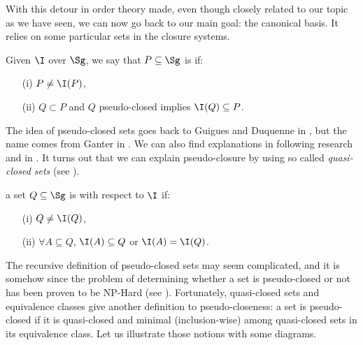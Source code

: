 With this detour in order theory made, even though closely related to our topic
as we have seen, we can now go back to our main goal: the canonical basis. It
relies on some particular sets in the closure systems.

\begin{definition} Given $\I$ over $\Sg$, we say
	that $P \subseteq \Sg$ is  if:
	\begin{itemize}
		\item[(i)] $P \neq \I(P)$,
		\item[(ii)] $Q \subset P$ and $Q$ pseudo-closed implies $\I(Q) 
		\subseteq P$.
	\end{itemize}
\end{definition}

\noindent The idea of pseudo-closed sets goes back to Guigues and Duquenne in
\cite{guigues_j.l_familles_1986}, but the name comes from Ganter in 
\cite{ganter_two_2010}. We can also find explanations in following 
research \cite{ganter_two_2010, day_lattice_1992} and
in \cite{b._ganter_conceptual_2016}. It turns out that we can explain 
pseudo-closure by using so called \textit{quasi-closed sets} (see 
\cite{wild_implicational_1989, ganter_two_2010, guigues_j.l_familles_1986}). 

\begin{definition} a set $Q \subseteq \Sg$ is 
	 with respect to $\I$ if:
	\begin{itemize}
		\item[(i)] $Q \neq \I(Q)$,
		\item[(ii)] $\forall A \subseteq Q$, $\I(A) \subseteq Q$ or $\I(A) = 
		\I(Q)$.
		
	\end{itemize}
	
\end{definition}

\noindent The recursive definition of pseudo-closed sets may seem complicated,
and it is somehow since the problem of determining whether a set is 
pseudo-closed or not has been proven to be NP-Hard (see 
\cite{b._ganter_conceptual_2016}). Fortunately, quasi-closed sets and 
equivalence classes give another definition to pseudo-closeness: a set is 
pseudo-closed if it is quasi-closed and minimal (inclusion-wise) among quasi-closed sets in its equivalence class. Let us illustrate those notions with some diagrams.


